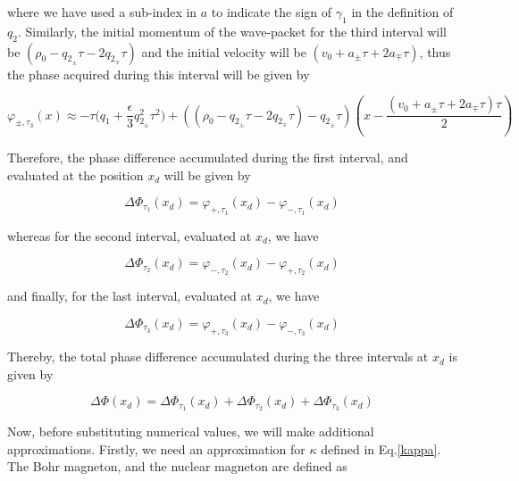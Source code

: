 \documentclass{article}
\begin{document}
where we have used a sub-index in $a$ to indicate the sign of $\gamma_{1}$ in the definition of $q_{2}$.
Similarly, the initial momentum of the wave-packet for the third interval will be $(\rho_{0} - q_{2_{\pm}} \tau-2q_{2_{\mp}}\tau)$ and the initial velocity will be $(v_{0}+a_{\pm}\tau + 2 a_{\mp}\tau)$, thus the phase acquired during this interval will be given by

\begin{equation}\label{approx_quantum_phase_3}
\varphi_{\pm, \tau_{3}}(x) \approx -\tau \bigg(q_{1} + \frac{\epsilon}{3} q_{2_{\pm}}^{2} \tau^{2}\bigg) + ((\rho_{0} - q_{2_{\pm}} \tau-2q_{2_{\mp}}\tau)-q_{2_{\pm}} \tau)(x-\frac{(v_{0}+a_{\pm}\tau + 2a_{\mp}\tau) \tau}{2})
\end{equation}

Therefore, the phase difference accumulated during the first interval, and evaluated at the position $x_{d}$ will be given by

\begin{equation}
\Delta \Phi_{\tau_{1}}(x_{d}) = \varphi_{+,\tau_{1}}(x_{d}) - \varphi_{-,\tau_{1}}(x_{d})
\end{equation}

whereas for the second interval, evaluated at $x_{d}$, we have

\begin{equation}
\Delta \Phi_{\tau_{2}}(x_{d}) = \varphi_{-,\tau_{2}}(x_{d}) - \varphi_{+,\tau_{2}}(x_{d})
\end{equation}

and finally, for the last interval, evaluated at $x_{d}$, we have

\begin{equation}
\Delta \Phi_{\tau_{3}}(x_{d}) = \varphi_{+,\tau_{3}}(x_{d}) - \varphi_{-,\tau_{3}}(x_{d})
\end{equation}

Thereby, the total phase difference accumulated during the three intervals at $x_{d}$ is given by 

\begin{equation}\label{pre_total_quantum_phase}
\Delta \Phi (x_{d}) = \Delta \Phi_{\tau_{1}}(x_{d}) + \Delta \Phi_{\tau_{2}}(x_{d}) + \Delta \Phi_{\tau_{3}}(x_{d})
\end{equation}

Now, before substituting numerical values, we will make additional approximations. Firstly, we need an approximation for $\kappa$ defined in Eq.\ref{kappa}. The Bohr magneton, and the nuclear magneton are defined as
\end{document}
